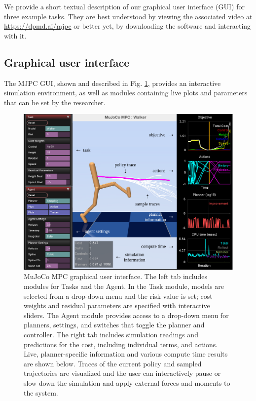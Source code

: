 We provide a short textual description of our graphical user interface (GUI) for three example tasks. They are best understood by viewing the associated video at \url{https://dpmd.ai/mjpc} or better yet, by downloading the software and interacting with it. 

\subsection{Graphical user interface}

The MJPC GUI, shown and described in Fig. \ref{ps_gui}, provides an interactive simulation environment, as well as modules containing live plots and parameters that can be set by the researcher. 

\begin{figure}[H]
	\centering
	\includegraphics[width=.95\textwidth]{predictive_sampling/gui.png}%
	\caption[MuJoCo MPC graphical user interface]{MuJoCo MPC graphical user interface. The left tab includes modules for Tasks and the Agent. In the Task module, models are selected from a drop-down menu and the risk value is set; cost weights and residual parameters are specified with interactive sliders. The Agent module provides access to a drop-down menu for planners, settings, and switches that toggle the planner and controller. The right tab includes simulation readings and predictions for the cost, including individual terms, and actions. Live, planner-specific information and various compute time results are shown below. Traces of the current policy and sampled trajectories are visualized and the user can interactively pause or slow down the simulation and apply external forces and moments to the system.}%
	\label{ps_gui}
\end{figure}

